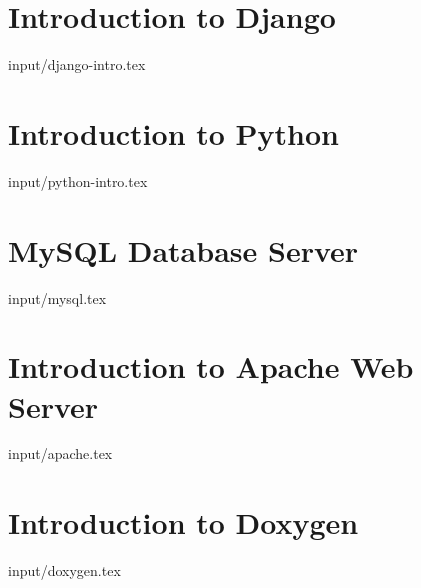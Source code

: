
\section{Introduction to Django}
 {input/django-intro.tex}
\section{Introduction to Python} 

 {input/python-intro.tex}
\section{MySQL Database Server}
 {input/mysql.tex}
\section{Introduction to Apache Web Server}
 {input/apache.tex}

\section{Introduction to Doxygen}
 {input/doxygen.tex}
